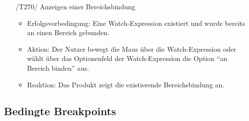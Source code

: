 \documentclass[parskip=full]{scrartcl}
\begin{document}
\begin{itemize}
	\item[/T270/] Anzeigen einer Bereichsbindung
		\begin{itemize}
		\item Erfolgsvorbedingung: Eine Watch-Expression existiert und wurde bereits an einen Bereich gebunden. 
		\item Aktion: Der Nutzer bewegt die Maus über die Watch-Expression oder wählt über das Optionenfeld der Watch-Expression die Option \enquote{an Bereich binden} aus. 
		\item Reaktion:	Das Produkt zeigt die existierende Bereichsbindung an.  
		\end{itemize}	
	
		
\end{itemize}
\subsection{Bedingte Breakpoints}
\end{document}
